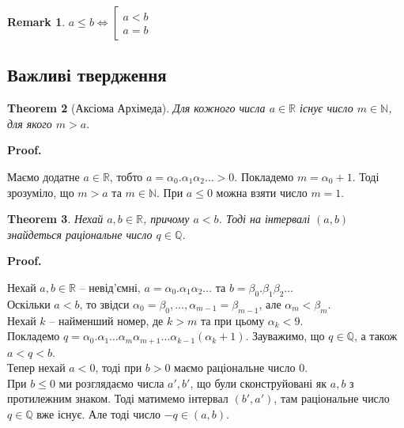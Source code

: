 \documentclass[a4paper, 14pt]{article}
\makeatletter
\def\qed{$\blacksquare$}
\theoremstyle{theoremdd}
\newtheorem{theorem}{Theorem}[subsection]
\theoremstyle{theoremdd}
\theoremstyle{theoremdd}
\theoremstyle{theoremdd}
\theoremstyle{theoremdd}
\theoremstyle{theoremdd}
\newtheorem{remark}[theorem]{Remark}
\theoremstyle{theoremdd}
\theoremstyle{theoremdd}
\renewenvironment{proof}[1][Proof.\\]{\par
\pushQED{\hfill \qed}%
\normalfont \topsep6\p@\@plus6\p@\relax
\trivlist
\item\relax
{\bfseries
#1\@addpunct{.}}\hspace\labelsep\ignorespaces
}{%
\popQED\endtrivlist\@endpefalse
}
\makeatother
\begin{document}
	\begin{remark}
	$a \leq b \iff \left[ \begin{gathered} a < b \\ a = b \end{gathered} \right.$
	\end{remark}
	
	\subsection{Важливі твердження}
	\begin{theorem}[Аксіома Архімеда]
	Для кожного числа $a \in \mathbb{R}$ існує число $m \in \mathbb{N}$, для якого $m > a$.
	\end{theorem}
	
	\begin{proof}
	Маємо додатне $a \in \mathbb{R}$, тобто $a = \alpha_0.\alpha_1 \alpha_2 \dots > 0$. Покладемо $m = \alpha_0 + 1$. Тоді зрозуміло, що $m > a$ та $m \in \mathbb{N}$. При $a \leq 0$ можна взяти число $m = 1$.
	\begin{figure}[H]
	\centering
	\qquad
	\end{figure}
	\end{proof}
	
	\begin{theorem}
	Нехай $a,b \in \mathbb{R}$, причому $a < b$. Тоді на інтервалі $(a,b)$ знайдеться раціональне число $q \in \mathbb{Q}$. 
	\end{theorem}
	
	\begin{proof}
	Нехай $a,b \in \mathbb{R}$ -- невід'ємні, $a = \alpha_0.\alpha_1 \alpha_2 \dots$ та $b = \beta_0.\beta_1 \beta_2 \dots$\\
	Оскільки $a < b$, то звідси $\alpha_0 = \beta_0, \dots, \alpha_{m-1} = \beta_{m-1}$, але $\alpha_m < \beta_m$.\\
	Нехай $k$ -- найменший номер, де $k > m$ та при цьому $\alpha_k < 9$. \\
	Покладемо $q = \alpha_0.\alpha_1 \dots \alpha_m \alpha_{m+1} \dots \alpha_{k-1}(\alpha_k+1)$. Зауважимо, що $q \in \mathbb{Q}$, а також $a < q < b$.\\
	Тепер нехай $a < 0$, тоді при $b > 0$ маємо раціональне число $0$. \\
	При $b \leq 0$ ми розглядаємо числа $a',b'$, що були сконструйовані як $a,b$ з протилежним знаком. Тоді матимемо інтервал $(b',a')$, там раціональне число $q \in \mathbb{Q}$ вже існує. Але тоді число $-q \in (a,b)$.
	\end{proof}
\end{document}
